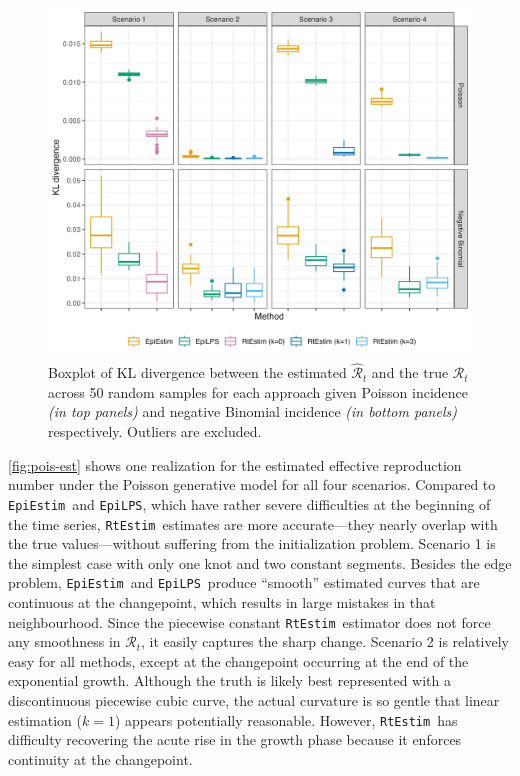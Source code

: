 \documentclass[10pt,letterpaper]{article}
\def\RtEstim{\texttt{RtEstim}}
\def\EpiEstim{\texttt{EpiEstim}}
\def\EpiLPS{\texttt{EpiLPS}}
\def\calR{\mathcal{R}}
\begin{document}
\begin{figure}[!h]
  \centering
  \includegraphics[width=.99\textwidth]{fig/KL_no_outlier.png}
  \caption{Boxplot of KL divergence between the estimated 
  $\hat{\calR}_t$ and the true $\calR_t$ across 50 random samples for 
  each approach given Poisson incidence \textit{(in top panels)} and negative 
  Binomial incidence \textit{(in bottom panels)} respectively.  
  Outliers are excluded.} 
  \label{fig:kl-res}
\end{figure}

\autoref{fig:pois-est} shows one realization for the estimated effective reproduction
number under the Poisson generative model for all four scenarios. Compared to
\EpiEstim\ and \EpiLPS, which have rather severe difficulties at the beginning
of the time series, \RtEstim\ estimates are more accurate---they nearly
overlap with the true values---without suffering from the initialization
problem. Scenario
1 is the simplest case with only one knot and two constant segments. Besides the
edge problem, \EpiEstim\ and \EpiLPS\ produce ``smooth'' estimated curves that
are continuous at the changepoint, which results in large mistakes in that
neighbourhood. Since the piecewise constant \RtEstim\ estimator does not force
any smoothness in $\calR_t$, it easily captures the sharp change. 
Scenario 2 is relatively easy for all methods, except at the changepoint 
occurring at the end of the exponential growth. Although the truth is
likely best represented with a discontinuous piecewise cubic curve, the actual
curvature is so gentle that linear estimation ($k=1$) appears potentially
reasonable. However,
\RtEstim\ has difficulty recovering the acute rise in the
growth phase because it enforces continuity at the changepoint. 
\end{document}
